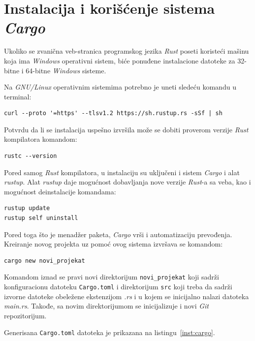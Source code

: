 \documentclass[12pt,oneside]{memoir}
\begin{document}
\section{Instalacija i korišćenje sistema \emph{Cargo}}
Ukoliko se zvanična veb-stranica programskog jezika \emph{Rust} poseti koristeći
mašinu koja ima \emph{Windows} operativni sistem, biće ponuđene
instalacione datoteke za 32-bitne i 64-bitne \emph{Windows} sisteme.

Na \emph{GNU/Linux} operativnim sistemima potrebno je uneti sledeću
komandu u terminal:

\begin{lstlisting}[language={}, style=text]
curl --proto '=https' --tlsv1.2 https://sh.rustup.rs -sSf | sh
\end{lstlisting}

\noindent
Potvrdu da li se instalacija uspešno izvršila može se dobiti proverom verzije
\emph{Rust} kompilatora komandom:

\begin{lstlisting}[language={}, style=text]
rustc --version
\end{lstlisting}

Pored samog \emph{Rust} kompilatora, u instalaciju su uključeni i
sistem \emph{Cargo} i alat \emph{rustup}. Alat \emph{rustup} daje mogućnost
dobavljanja nove verzije \emph{Rust}-a sa veba, kao i
mogućnost deinstalacije komandama:

\begin{lstlisting}[language={}, style=text]
rustup update
rustup self uninstall
\end{lstlisting}

Pored toga što je menadžer paketa, \emph{Cargo} vrši i automatizaciju
prevođenja. Kreiranje novog projekta uz pomoć ovog sistema izvršava
se komandom:

\begin{lstlisting}[language={}, style=text]
cargo new novi_projekat
\end{lstlisting}

Komandom iznad se pravi novi direktorijum \texttt{novi\_projekat} koji
sadrži konfiguracionu datoteku \texttt{Cargo.toml} i direktorijum \texttt{src}
koji treba da sadrži izvorne datoteke obeležene ekstenzijom \emph{.rs}
i u kojem se inicijalno nalazi datoteka \emph{main.rs}. Takođe, sa novim direktorijumom se
inicijalizuje i novi \emph{Git} repozitorijum.

Generisana \texttt{Cargo.toml} datoteka je prikazana na listingu~\ref{inst:cargo}.
\end{document}
